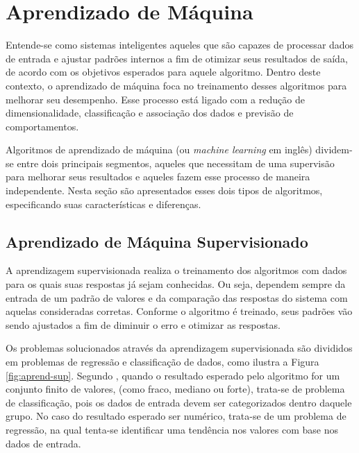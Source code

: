 \documentclass[oneside,openright,12pt]{ufsm_2015} %
\begin{document}

\section{Aprendizado de Máquina}
\label{sec:fund-aprend-maquina}

    \par Entende-se como sistemas inteligentes aqueles que são capazes de processar dados de entrada e ajustar padrões internos a fim de otimizar seus resultados de saída, de acordo com os objetivos esperados para aquele algoritmo. Dentro deste contexto, o aprendizado de máquina foca no treinamento desses algoritmos para melhorar seu desempenho. Esse processo está ligado com a redução de dimensionalidade, classificação e associação dos dados e previsão de comportamentos.

    \par Algoritmos de aprendizado de máquina (ou \textit{machine learning} em inglês) dividem-se entre dois principais segmentos, aqueles que necessitam de uma supervisão para melhorar seus resultados e aqueles fazem esse processo de maneira independente. Nesta seção são apresentados esses dois tipos de algoritmos, especificando suas características e diferenças.


\subsection{Aprendizado de Máquina Supervisionado}
\label{sec:fund-am-sup}

    \par A aprendizagem supervisionada realiza o treinamento dos algoritmos com dados para os quais suas respostas já sejam conhecidas. Ou seja, dependem sempre da entrada de um padrão de valores e da comparação das respostas do sistema com aquelas consideradas corretas. Conforme o algoritmo é treinado, seus padrões vão sendo ajustados a fim de diminuir o erro e otimizar as respostas. 

    \par Os problemas solucionados através da aprendizagem supervisionada são divididos em problemas de regressão e classificação de dados, como ilustra a Figura \ref{fig:aprend-sup}. Segundo \cite{book:russell:10}, quando o resultado esperado pelo algoritmo for um conjunto finito de valores, (como fraco, mediano ou forte), trata-se de problema de classificação, pois os dados de entrada devem ser categorizados dentro daquele grupo. No caso do resultado esperado ser numérico, trata-se de um problema de regressão, na qual tenta-se identificar uma tendência nos valores com base nos dados de entrada.
\end{document}
